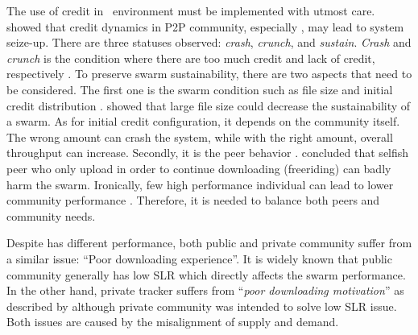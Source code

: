 
The use of credit in \bt~environment must be implemented with utmost care. \citeauthor{2010:crashsustain:rahman} showed that credit dynamics in P2P community, especially \bt, may lead to system seize-up. There are three statuses observed: \textit{crash}, \textit{crunch}, and \textit{sustain}. \textit{Crash} and \textit{crunch} is the condition where there are too much credit and lack of credit, respectively \cite{2010:crashsustain:rahman, 2015:sustainabilitypt:vinko}. To preserve swarm sustainability, there are two aspects that need to be considered. The first one is the swarm condition such as file size and initial credit distribution \cite{2015:sustainabilitypt:vinko}. \citeauthor{2015:sustainabilitypt:vinko} showed that large file size could decrease the sustainability of a swarm. As for initial credit configuration, it depends on the community itself. The wrong amount can crash the system, while with the right amount, overall throughput can increase. Secondly, it is the peer behavior \cite{2010:crashsustain:rahman}. \citeauthor{2010:crashsustain:rahman} concluded that selfish peer who only upload in order to continue downloading (freeriding) can badly harm the swarm. Ironically, few high performance individual can lead to lower community performance \cite{2015:sustainabilitypt:vinko}. Therefore, it is needed to balance both peers and community needs.

Despite has different performance, both public and private community suffer from a similar issue: ``Poor downloading experience''. It is widely known that public community generally has low SLR which directly affects the swarm performance. In the other hand, private tracker suffers from ``\textit{poor downloading motivation}'' as described by \citeauthor{2014:sustainabilitytorrent:chen}\cite{2014:sustainabilitytorrent:chen} although private community was intended to solve low SLR issue. Both issues are caused by the misalignment of supply and demand.

